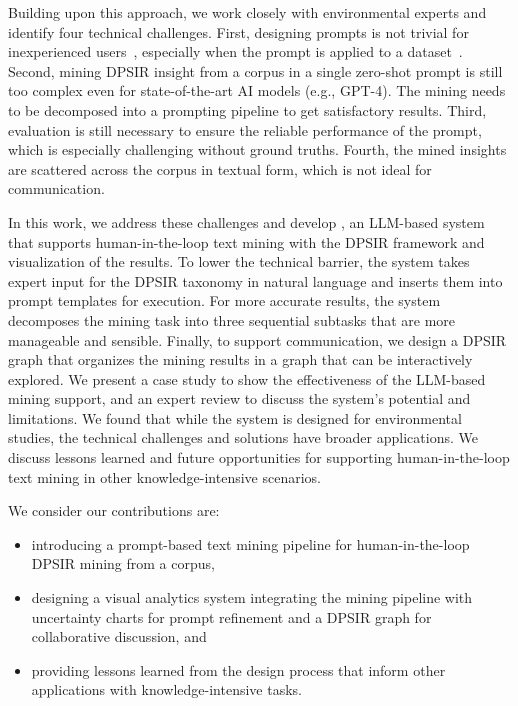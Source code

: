 Building upon this approach, we work closely with environmental experts and identify four technical challenges.
First, designing prompts is not trivial for inexperienced users~\cite{zamfirescu2023johnny, kim2024evallm}, especially when the prompt is applied to a dataset~\cite{lee2024awesum}.
Second, mining DPSIR insight from a corpus in a single zero-shot prompt is still too complex even for state-of-the-art AI models (e.g., GPT-4). The mining needs to be decomposed into a prompting pipeline to get satisfactory results.
Third, evaluation is still necessary to ensure the reliable performance of the prompt, which is especially challenging without ground truths.
Fourth, the mined insights are scattered across the corpus in textual form, which is not ideal for communication. 

In this work, we address these challenges and develop \system, an LLM-based system that supports human-in-the-loop text mining with the DPSIR framework and visualization of the results.
To lower the technical barrier, the system takes expert input for the DPSIR taxonomy in natural language and inserts them into prompt templates for execution.
For more accurate results, the system decomposes the mining task into three sequential subtasks that are more manageable and sensible.
Finally,  to support communication, we design a DPSIR graph that organizes the mining results in a graph that can be interactively explored.
We present a case study to show the effectiveness of the LLM-based mining support, 
and an expert review to discuss the system's potential and limitations.
We found that while the system is designed for environmental studies, the technical challenges and solutions have broader applications. We discuss lessons learned and future opportunities for supporting human-in-the-loop text mining in other knowledge-intensive scenarios.

We consider our contributions are:
\begin{itemize}[noitemsep, topsep=0pt]
    \item introducing a prompt-based text mining pipeline for human-in-the-loop DPSIR mining from a corpus,
    \item designing a visual analytics system integrating the mining pipeline with uncertainty charts for prompt refinement and a DPSIR graph for collaborative discussion, and
    \item providing lessons learned from the design process that inform other applications with knowledge-intensive tasks.
\end{itemize}

